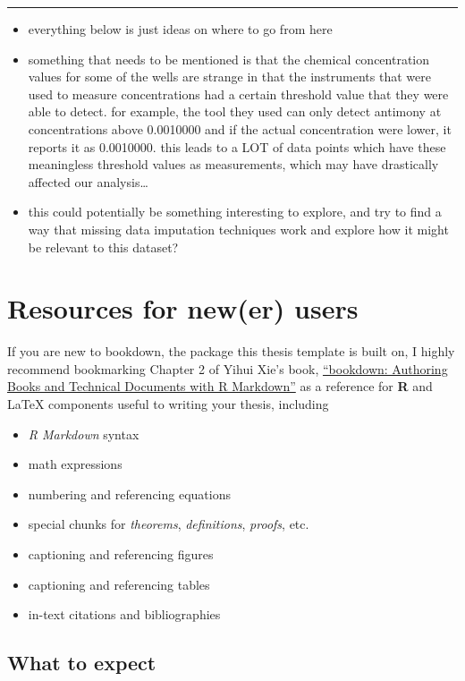 \documentclass[12pt, twoside]{amherstthesis}
\providecommand{\tightlist}{%
  \setlength{\itemsep}{0pt}\setlength{\parskip}{0pt}}
\begin{document}
\begin{center}\rule{0.5\linewidth}{0.5pt}\end{center}
\begin{itemize}
\item
  everything below is just ideas on where to go from here
\item
  something that needs to be mentioned is that the chemical concentration values for some of the wells are strange in that the instruments that were used to measure concentrations had a certain threshold value that they were able to detect. for example, the tool they used can only detect antimony at concentrations above 0.0010000 and if the actual concentration were lower, it reports it as 0.0010000. this leads to a LOT of data points which have these meaningless threshold values as measurements, which may have drastically affected our analysis\ldots{}
\item
  this could potentially be something interesting to explore, and try to find a way that missing data imputation techniques work and explore how it might be relevant to this dataset?
\end{itemize}
\hypertarget{resources}{%
\section{Resources for new(er) users}\label{resources}}

If you are new to bookdown, the package this thesis template is built on, I highly recommend bookmarking Chapter 2 of Yihui Xie's book, \href{https://bookdown.org/yihui/bookdown/markdown-syntax.html}{``bookdown: Authoring Books and Technical Documents with R Markdown''} as a reference for \textbf{R} and LaTeX components useful to writing your thesis, including
\begin{itemize}
\tightlist
\item
  \emph{R Markdown} syntax
\item
  math expressions
\item
  numbering and referencing equations
\item
  special chunks for \emph{theorems}, \emph{definitions}, \emph{proofs}, etc.
\item
  captioning and referencing figures
\item
  captioning and referencing tables
\item
  in-text citations and bibliographies
\end{itemize}
\hypertarget{what-to-expect}{%
\subsection{What to expect}\label{what-to-expect}}
\end{document}
